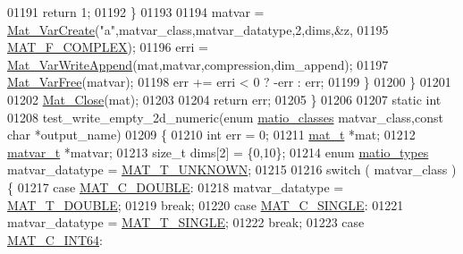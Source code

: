 \begin{DoxyCode}
{{{01191                     \textcolor{keywordflow}{return} 1;
01192             \}
01193 
01194             matvar = \hyperlink{group___m_a_t_ga1c54a84bb4d810c6fccdb8869489eac4}{Mat\_VarCreate}(\textcolor{stringliteral}{"a"},matvar\_class,matvar\_datatype,2,dims,&z,
01195                                    \hyperlink{group___m_a_t_ggab9d6ef9e3ddca78a317b173f01d53fbbacd7b091a11184aad7fc6078c04470780}{MAT\_F\_COMPLEX});
01196             erri = \hyperlink{group___m_a_t_ga9402f3f2fbec82fdb66bf1479c689727}{Mat\_VarWriteAppend}(mat,matvar,compression,dim\_append);
01197             \hyperlink{group___m_a_t_ga1d14716f7450530fd1c9d02413787f0e}{Mat\_VarFree}(matvar);
01198             err += erri < 0 ? -err : err;
01199         \}
01200     \}
01201 
01202     \hyperlink{group___m_a_t_ga101c92ff7bde4a2d4615661beba09262}{Mat\_Close}(mat);
01203 
01204     \textcolor{keywordflow}{return} err;
01205 \}
01206 
01207 \textcolor{keyword}{static} \textcolor{keywordtype}{int}
01208 test\_write\_empty\_2d\_numeric(\textcolor{keyword}{enum} \hyperlink{group___m_a_t_gad4d60ae7b709fc81bfd744fb4c857c40}{matio\_classes} matvar\_class,\textcolor{keyword}{const} \textcolor{keywordtype}{char} *output\_name)
01209 \{
01210     \textcolor{keywordtype}{int}       err = 0;
01211     \hyperlink{struct__mat__t}{mat\_t}    *mat;
01212     \hyperlink{group___m_a_t_structmatvar__t}{matvar\_t} *matvar;
01213     \textcolor{keywordtype}{size\_t}    dims[2] = \{0,10\};
01214     \textcolor{keyword}{enum} \hyperlink{group___m_a_t_gacf7b3b879282b7ab3a51190e49bf3453}{matio\_types} matvar\_datatype = \hyperlink{group___m_a_t_ggacf7b3b879282b7ab3a51190e49bf3453a2a7318fe8bf9464935e7ed8902618293}{MAT\_T\_UNKNOWN};
01215 
01216     \textcolor{keywordflow}{switch} ( matvar\_class ) \{
01217         \textcolor{keywordflow}{case} \hyperlink{group___m_a_t_ggad4d60ae7b709fc81bfd744fb4c857c40a5d70e0862e5bdb7bd86bf7ba5948f307}{MAT\_C\_DOUBLE}:
01218             matvar\_datatype = \hyperlink{group___m_a_t_ggacf7b3b879282b7ab3a51190e49bf3453a31e721ecf7e188196f83c32838288797}{MAT\_T\_DOUBLE};
01219             \textcolor{keywordflow}{break};
01220         \textcolor{keywordflow}{case} \hyperlink{group___m_a_t_ggad4d60ae7b709fc81bfd744fb4c857c40a2825631e26a961cbe0f79db50a39cea2}{MAT\_C\_SINGLE}:
01221             matvar\_datatype = \hyperlink{group___m_a_t_ggacf7b3b879282b7ab3a51190e49bf3453a3a3657d40e9212c923d9b9d03531b64c}{MAT\_T\_SINGLE};
01222             \textcolor{keywordflow}{break};
01223         \textcolor{keywordflow}{case} \hyperlink{group___m_a_t_ggad4d60ae7b709fc81bfd744fb4c857c40a1ea83bcde49b35477494412973f82409}{MAT\_C\_INT64}:
}}}
\end{DoxyCode}
